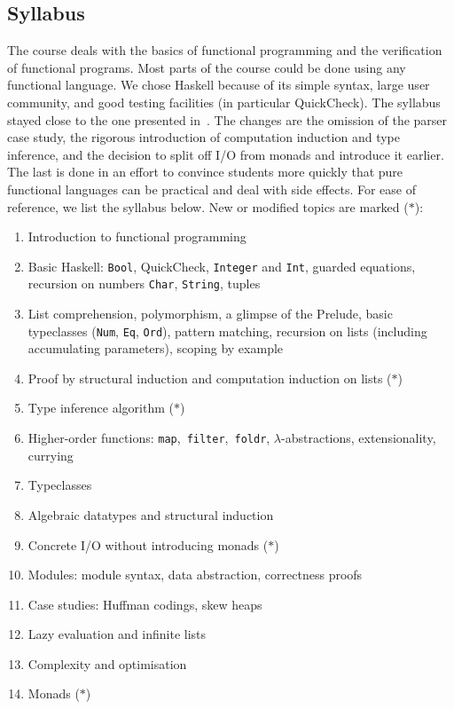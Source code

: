 \subsection{Syllabus\label{sec:syllabus}}

The course deals with the basics of functional programming and the verification of functional programs.
Most parts of the course could be done using any functional language.
We chose Haskell because of its simple syntax, large user community, and good testing facilities (in particular QuickCheck).
The syllabus stayed close to the one presented in~\cite{next_1100}.
The changes are the omission of the parser case study, the rigorous introduction of computation induction and type inference, and the decision to split off I/O from monads and introduce it earlier.
The last is done in an effort to convince
students more quickly that pure functional languages can be practical and deal with side effects.
For ease of reference, we list the syllabus below.
New or modified topics are marked ($\ast$):

\begin{multicols}{2}
\begin{enumerate}
  \item Introduction to functional programming
  \item Basic Haskell: \texttt{Bool}, QuickCheck, \texttt{Integer} and \texttt{Int}, guarded equations, recursion on numbers \texttt{Char}, \texttt{String}, tuples
  \item List comprehension, polymorphism, a glimpse of the Prelude, basic typeclasses (\texttt{Num}, \texttt{Eq}, \texttt{Ord}), pattern matching, recursion on lists (including accumulating parameters), scoping by example
  \item Proof by structural induction and computation induction on lists ($\ast$)
  \item Type inference algorithm ($\ast$)
  \item Higher-order functions: \texttt{map},~\texttt{filter},~\texttt{foldr}, $\lambda$-abstractions, extensionality, currying
  \item Typeclasses
  \item Algebraic datatypes and structural induction
  \item Concrete I/O without introducing monads ($\ast$)
  \item Modules: module syntax, data abstraction, correctness proofs
  \item Case studies: Huffman codings, skew heaps
  \item Lazy evaluation and infinite lists
  \item Complexity and optimisation
  \item Monads ($\ast$)
\end{enumerate}
\end{multicols}

